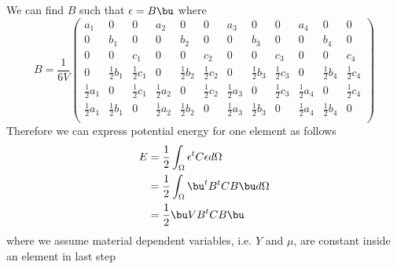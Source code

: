 \documentclass[11pt]{article}
\begin{document}
We can find $B$ such that $\epsilon = B\bu$
where 
\[
    B = 
    \frac{1}{6V}
    \begin{pmatrix}
        a_1 & 0 & 0 & a_2 & 0 & 0 & a_3 & 0 & 0 & a_4 & 0 & 0 \\
        0 & b_1 & 0 & 0 & b_2 & 0 & 0 & b_3 & 0 & 0 & b_4 & 0 \\
        0 & 0 & c_1 & 0 & 0 & c_2 & 0 & 0 & c_3 & 0 & 0 & c_4 \\
        0 & \frac{1}{2} b_1 & \frac{1}{2} c_1 & 0 & \frac{1}{2} b_2 & \frac{1}{2} c_2 & 0 & \frac{1}{2} b_3 & \frac{1}{2}c_3 & 0 & \frac{1}{2} b_4 &\frac{1}{2} c_4 \\
        \frac{1}{2} a_1 & 0 & \frac{1}{2} c_1 & \frac{1}{2} a_2 & 0 & \frac{1}{2} c_2 & \frac{1}{2} a_3 & 0 & \frac{1}{2} c_3 & \frac{1}{2} a_4 & 0 & \frac{1}{2} c_4 \\
        \frac{1}{2}a_1 & \frac{1}{2}b_1 & 0 & \frac{1}{2}a_2 & \frac{1}{2}b_2 & 0 & \frac{1}{2}a_3 & \frac{1}{2}b_3 & 0 & \frac{1}{2}a_4 & \frac{1}{2}b_4 & 0 \\
    \end{pmatrix}  
\]
Therefore we can express potential energy for one element as follows
\begin{align*}
    E 
    &= \frac{1}{2} \int_{\Omega} \epsilon^t C \epsilon d\Omega \\
    &= \frac{1}{2} \int_{\Omega} \bu^t B^t C B \bu d\Omega \\
    &= \frac{1}{2}\bu VB^t C B \bu
\end{align*}
where we assume material dependent variables, i.e. $Y$ and $\mu$, are constant inside an element in last step
\end{document}
